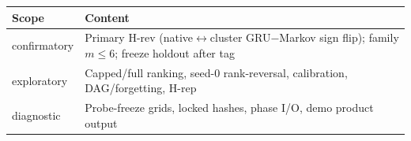 \begin{tabular}{lp{}}
\toprule
Scope & Content \\
\midrule
confirmatory & Primary H-rev (native$\leftrightarrow$cluster GRU$-$Markov sign flip); family $m\le 6$; freeze holdout after tag \\
exploratory & Capped/full ranking, seed-0 rank-reversal, calibration, DAG/forgetting, H-rep \\
diagnostic & Probe-freeze grids, locked hashes, phase I/O, demo product output \\
\bottomrule
\end{tabular}
